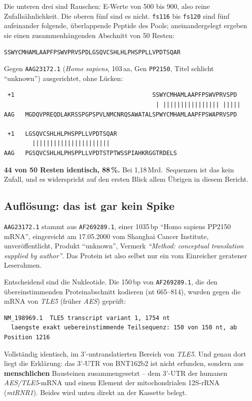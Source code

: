 \documentclass[11pt,a4paper]{article}
\begin{document}
Die unteren drei sind Rauschen: E-Werte von 500 bis 900, also reine
Zufallsähnlichkeit. Die oberen fünf sind es nicht. \texttt{fs116} bis
\texttt{fs120} sind fünf aufeinander folgende, überlappende Peptide des Pools;
aneinandergelegt ergeben sie einen zusammenhängenden Abschnitt von 50 Resten:

\begin{center}
\texttt{SSWYCMHAMLAAPFPSWVPRVSPDLGSQVCSHLHLPHSPPLLVPDTSQAR}
\end{center}

Gegen \texttt{AAG23172.1} (\emph{Homo sapiens}, 103\,aa, Gen \texttt{PP2150},
Titel schlicht ``unknown'') ausgerichtet, ohne Lücken:

\begin{lstlisting}
 +1                                       SSWYCMHAMLAAPFPSWVPRVSPD
                                           | |||||||||||||||| |||||
AAG   MGDQVPREQDLAKRSSPGPSPVLNMCNRQSAWATALSPWYCMHAMLAAPFPSWAPRVSPD

 +1   LGSQVCSHLHLPHSPPLLVPDTSQAR
        ||||||||||||||||||||||
AAG   PGSQVCSHLHLPHSPPLLVPDTSTPTWSSPIAHKRGGTRDELS
\end{lstlisting}

\textbf{44 von 50 Resten identisch, 88\,\%.} Bei 1,18\,Mrd.\ Sequenzen ist das
kein Zufall, und es widerspricht auf den ersten Blick allem Übrigen in diesem
Bericht.

\subsection{Auflösung: das ist gar kein Spike}

\texttt{AAG23172.1} stammt aus \texttt{AF269289.1}, einer 1035\,bp
``Homo sapiens PP2150 mRNA'', eingereicht am 17.05.2000 vom Shanghai Cancer
Institute, unveröffentlicht, Produkt ``unknown'', Vermerk \emph{``Method:
conceptual translation supplied by author''}. Das Protein ist also selbst nur
ein vom Einreicher geratener Leserahmen.

Entscheidend sind die Nukleotide. Die 150\,bp von \texttt{AF269289.1}, die
den übereinstimmenden Proteinabschnitt kodieren (nt 665--814), wurden gegen die
mRNA von \emph{TLE5} (früher \emph{AES}) geprüft:

\begin{lstlisting}
NM_198969.1  TLE5 transcript variant 1, 1754 nt
  laengste exakt uebereinstimmende Teilsequenz: 150 von 150 nt, ab Position 1216
\end{lstlisting}

Vollständig identisch, im 3'-untranslatierten Bereich von \emph{TLE5}. Und
genau dort liegt die Erklärung: das 3'-UTR von BNT162b2 ist nicht erfunden,
sondern aus \textbf{menschlichen} Bausteinen zusammengesetzt -- dem 3'-UTR der
humanen \emph{AES/TLE5}-mRNA und einem Element der mitochondrialen
12S-rRNA (\emph{mtRNR1}). Beides wird unten direkt an der Kassette belegt.
\end{document}
